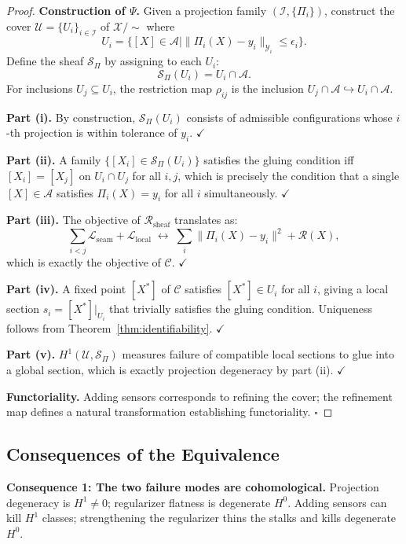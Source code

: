 \documentclass[12pt, oneside]{article}
\newcommand{\Xmod}{\mathcal{X}/{\sim}}
\begin{document}
\begin{proof}
\textbf{Construction of $\Psi$.} Given a projection family
$(\mathcal{I}, \{\Pi_i\})$, construct the cover
$\mathcal{U} = \{U_i\}_{i \in \mathcal{I}}$ of $\Xmod$ where
\[
U_i = \{ [X] \in \mathcal{A} \mid \|\Pi_i(X) - y_i\|_{\mathcal{Y}_i} \le \epsilon_i \}.
\]
Define the sheaf $\mathcal{S}_\Pi$ by assigning to each $U_i$:
\[
\mathcal{S}_\Pi(U_i) = U_i \cap \mathcal{A}.
\]
For inclusions $U_j \subseteq U_i$, the restriction map $\rho_{ij}$ is the inclusion
$U_j \cap \mathcal{A} \hookrightarrow U_i \cap \mathcal{A}$.

\textbf{Part (i).} By construction, $\mathcal{S}_\Pi(U_i)$ consists of admissible
configurations whose $i$-th projection is within tolerance of $y_i$. $\checkmark$

\textbf{Part (ii).} A family $\{[X_i] \in \mathcal{S}_\Pi(U_i)\}$ satisfies the gluing
condition iff $[X_i] = [X_j]$ on $U_i \cap U_j$ for all $i,j$, which is precisely the
condition that a single $[X] \in \mathcal{A}$ satisfies $\Pi_i(X) = y_i$ for all $i$
simultaneously. $\checkmark$

\textbf{Part (iii).} The objective of $\mathcal{R}_{\mathrm{sheaf}}$ translates as:
\[
\sum_{i<j} \mathcal{L}_{\mathrm{seam}} + \mathcal{L}_{\mathrm{local}}
\;\longleftrightarrow\;
\sum_i \|\Pi_i(X) - y_i\|^2 + \mathcal{R}(X),
\]
which is exactly the objective of $\mathcal{C}$. $\checkmark$

\textbf{Part (iv).} A fixed point $[X^*]$ of $\mathcal{C}$ satisfies
$[X^*] \in U_i$ for all $i$, giving a local section $s_i = [X^*]|_{U_i}$ that trivially
satisfies the gluing condition. Uniqueness follows from Theorem~\ref{thm:identifiability}.
$\checkmark$

\textbf{Part (v).} $H^1(\mathcal{U}, \mathcal{S}_\Pi)$ measures failure of compatible
local sections to glue into a global section, which is exactly projection degeneracy by
part (ii). $\checkmark$

\textbf{Functoriality.} Adding sensors corresponds to refining the cover; the refinement
map defines a natural transformation establishing functoriality. $\square$
\end{proof}

\subsection{Consequences of the Equivalence}

\textbf{Consequence 1: The two failure modes are cohomological.} Projection degeneracy is
$H^1 \ne 0$; regularizer flatness is degenerate $H^0$. Adding sensors can kill $H^1$
classes; strengthening the regularizer thins the stalks and kills degenerate $H^0$.
\end{document}
